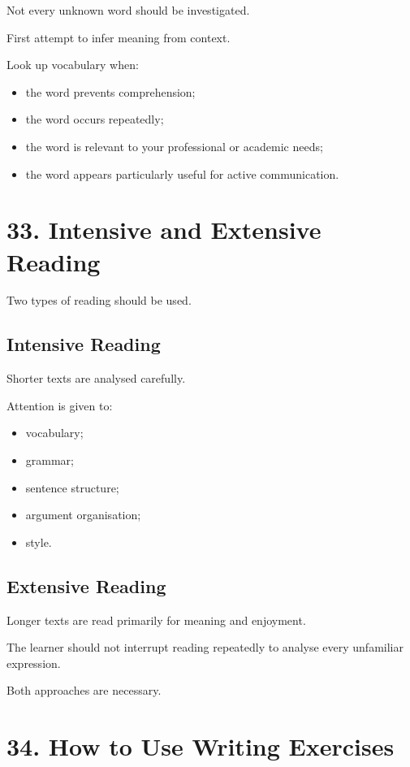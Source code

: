 Not every unknown word should be investigated.

First attempt to infer meaning from context.

Look up vocabulary when:

\begin{itemize}
    \item the word prevents comprehension;
    \item the word occurs repeatedly;
    \item the word is relevant to your professional or academic needs;
    \item the word appears particularly useful for active communication.
\end{itemize}

\section*{33. Intensive and Extensive Reading}

Two types of reading should be used.

\subsection*{Intensive Reading}

Shorter texts are analysed carefully.

Attention is given to:

\begin{itemize}
    \item vocabulary;
    \item grammar;
    \item sentence structure;
    \item argument organisation;
    \item style.
\end{itemize}

\subsection*{Extensive Reading}

Longer texts are read primarily for meaning and enjoyment.

The learner should not interrupt reading repeatedly to analyse every unfamiliar expression.

Both approaches are necessary.

\section*{34. How to Use Writing Exercises}

